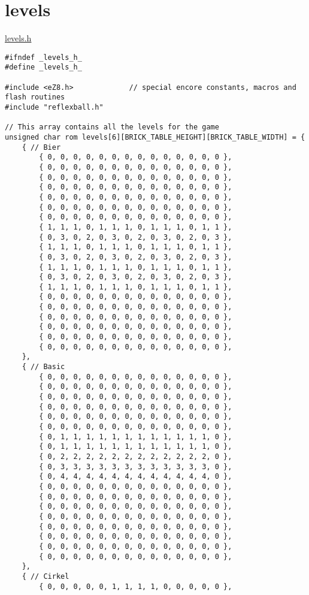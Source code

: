 \section{levels}
\label{levels}

\underline{levels.h}
\begin{lstlisting}
#ifndef _levels_h_
#define _levels_h_

#include <eZ8.h>             // special encore constants, macros and flash routines
#include "reflexball.h"

// This array contains all the levels for the game
unsigned char rom levels[6][BRICK_TABLE_HEIGHT][BRICK_TABLE_WIDTH] = {
	{ // Bier
		{ 0, 0, 0, 0, 0, 0, 0, 0, 0, 0, 0, 0, 0, 0 },
		{ 0, 0, 0, 0, 0, 0, 0, 0, 0, 0, 0, 0, 0, 0 },
		{ 0, 0, 0, 0, 0, 0, 0, 0, 0, 0, 0, 0, 0, 0 },
		{ 0, 0, 0, 0, 0, 0, 0, 0, 0, 0, 0, 0, 0, 0 },
		{ 0, 0, 0, 0, 0, 0, 0, 0, 0, 0, 0, 0, 0, 0 },
		{ 0, 0, 0, 0, 0, 0, 0, 0, 0, 0, 0, 0, 0, 0 },
		{ 0, 0, 0, 0, 0, 0, 0, 0, 0, 0, 0, 0, 0, 0 },
		{ 1, 1, 1, 0, 1, 1, 1, 0, 1, 1, 1, 0, 1, 1 },
		{ 0, 3, 0, 2, 0, 3, 0, 2, 0, 3, 0, 2, 0, 3 },
		{ 1, 1, 1, 0, 1, 1, 1, 0, 1, 1, 1, 0, 1, 1 },
		{ 0, 3, 0, 2, 0, 3, 0, 2, 0, 3, 0, 2, 0, 3 },		
		{ 1, 1, 1, 0, 1, 1, 1, 0, 1, 1, 1, 0, 1, 1 },
		{ 0, 3, 0, 2, 0, 3, 0, 2, 0, 3, 0, 2, 0, 3 },
		{ 1, 1, 1, 0, 1, 1, 1, 0, 1, 1, 1, 0, 1, 1 },		
		{ 0, 0, 0, 0, 0, 0, 0, 0, 0, 0, 0, 0, 0, 0 },
		{ 0, 0, 0, 0, 0, 0, 0, 0, 0, 0, 0, 0, 0, 0 },
		{ 0, 0, 0, 0, 0, 0, 0, 0, 0, 0, 0, 0, 0, 0 },
		{ 0, 0, 0, 0, 0, 0, 0, 0, 0, 0, 0, 0, 0, 0 },
		{ 0, 0, 0, 0, 0, 0, 0, 0, 0, 0, 0, 0, 0, 0 },
		{ 0, 0, 0, 0, 0, 0, 0, 0, 0, 0, 0, 0, 0, 0 },
	},
	{ // Basic
		{ 0, 0, 0, 0, 0, 0, 0, 0, 0, 0, 0, 0, 0, 0 },
		{ 0, 0, 0, 0, 0, 0, 0, 0, 0, 0, 0, 0, 0, 0 },
		{ 0, 0, 0, 0, 0, 0, 0, 0, 0, 0, 0, 0, 0, 0 },
		{ 0, 0, 0, 0, 0, 0, 0, 0, 0, 0, 0, 0, 0, 0 },
		{ 0, 0, 0, 0, 0, 0, 0, 0, 0, 0, 0, 0, 0, 0 },
		{ 0, 0, 0, 0, 0, 0, 0, 0, 0, 0, 0, 0, 0, 0 },
		{ 0, 1, 1, 1, 1, 1, 1, 1, 1, 1, 1, 1, 1, 0 },
		{ 0, 1, 1, 1, 1, 1, 1, 1, 1, 1, 1, 1, 1, 0 },
		{ 0, 2, 2, 2, 2, 2, 2, 2, 2, 2, 2, 2, 2, 0 },
		{ 0, 3, 3, 3, 3, 3, 3, 3, 3, 3, 3, 3, 3, 0 },
		{ 0, 4, 4, 4, 4, 4, 4, 4, 4, 4, 4, 4, 4, 0 },
		{ 0, 0, 0, 0, 0, 0, 0, 0, 0, 0, 0, 0, 0, 0 },
		{ 0, 0, 0, 0, 0, 0, 0, 0, 0, 0, 0, 0, 0, 0 },
		{ 0, 0, 0, 0, 0, 0, 0, 0, 0, 0, 0, 0, 0, 0 },
		{ 0, 0, 0, 0, 0, 0, 0, 0, 0, 0, 0, 0, 0, 0 },
		{ 0, 0, 0, 0, 0, 0, 0, 0, 0, 0, 0, 0, 0, 0 },
		{ 0, 0, 0, 0, 0, 0, 0, 0, 0, 0, 0, 0, 0, 0 },
		{ 0, 0, 0, 0, 0, 0, 0, 0, 0, 0, 0, 0, 0, 0 },
		{ 0, 0, 0, 0, 0, 0, 0, 0, 0, 0, 0, 0, 0, 0 },
	},	
	{ // Cirkel
		{ 0, 0, 0, 0, 0, 1, 1, 1, 1, 0, 0, 0, 0, 0 },

\end{lstlisting}
